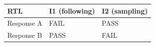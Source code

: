 \begin{tabular}{lll}
\toprule
RTL & I1 (following) & I2 (sampling) \\
\midrule
Response A & FAIL & PASS \\
Response B & PASS & FAIL \\
\bottomrule
\end{tabular}
